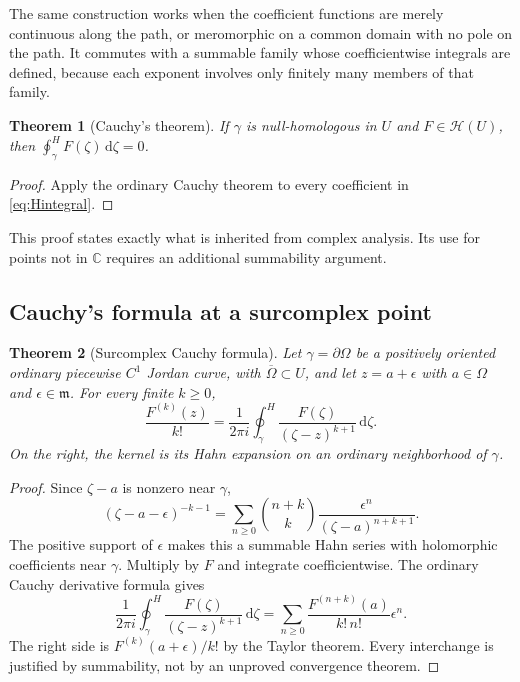 \documentclass[11pt,oneside]{article}
\numberwithin{equation}{section}
\newtheorem{theorem}{Theorem}[section]
\theoremstyle{definition}
\theoremstyle{remark}\newtheorem{remark}[theorem]{Remark}
\newcommand{\C}{\mathbb C}
\newcommand{\HH}{\mathscr H}
\newcommand{\m}{\mathfrak m}
\newcommand{\hoint}{\mathop{\oint}\nolimits^{\!H}}
\newcommand{\dd}{\,\mathrm d}
\begin{document}
The same construction works when the coefficient functions are merely
continuous along the path, or meromorphic on a common domain with no pole
on the path. It commutes with a summable family whose coefficientwise
integrals are defined, because each exponent involves only finitely many
members of that family.

\begin{theorem}[Cauchy's theorem]
If $\gamma$ is null-homologous in $U$ and $F\in\HH(U)$, then
$\hoint_\gamma F(\zeta)\dd\zeta=0$.
\end{theorem}
\begin{proof}
Apply the ordinary Cauchy theorem to every coefficient in
\eqref{eq:Hintegral}.
\end{proof}
This proof states exactly what is inherited from complex analysis. Its
use for points not in $\C$ requires an additional summability argument.

\subsection{Cauchy's formula at a surcomplex point}
\begin{theorem}[Surcomplex Cauchy formula]\label{thm:cauchy}
Let $\gamma=\partial\Omega$ be a positively oriented ordinary piecewise
$C^1$ Jordan curve, with $\overline\Omega\subset U$, and let
$z=a+\epsilon$ with $a\in\Omega$ and $\epsilon\in\m$. For every finite
$k\geq0$,
\begin{equation}\label{eq:CauchyH}
 \frac{F^{(k)}(z)}{k!}
 =\frac1{2\pi i}\hoint_\gamma
      \frac{F(\zeta)}{(\zeta-z)^{k+1}}\dd\zeta.
\end{equation}
On the right, the kernel is its Hahn expansion on an ordinary
neighborhood of $\gamma$.
\end{theorem}
\begin{proof}
Since $\zeta-a$ is nonzero near $\gamma$,
\[
 (\zeta-a-\epsilon)^{-k-1}
  =\sum_{n\geq0}\binom{n+k}{k}
       \frac{\epsilon^n}{(\zeta-a)^{n+k+1}}.
\]
The positive support of $\epsilon$ makes this a summable Hahn series with
holomorphic coefficients near $\gamma$. Multiply by $F$ and integrate
coefficientwise. The ordinary Cauchy derivative formula gives
\[
 \frac1{2\pi i}\hoint_\gamma
       \frac{F(\zeta)}{(\zeta-z)^{k+1}}\dd\zeta
 =\sum_{n\geq0}\frac{F^{(n+k)}(a)}{k!\,n!}\epsilon^n.
\]
The right side is $F^{(k)}(a+\epsilon)/k!$ by the Taylor theorem.
Every interchange is justified by summability, not by an unproved
convergence theorem.
\end{proof}
\end{document}
